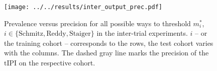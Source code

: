 \begin{figure}
    \centering
    \texttt{[image: ../../results/inter\_output\_prec.pdf]}
    \caption{Prevalence versus precision for all possible ways to threshold $m^*_i$, $i \in 
        \{ \text{Schmitz}, \text{Reddy}, \text{Staiger} \}$ in the inter-trial experiments. $i$ -- or the 
        training cohort -- corresponds to the rows, the test cohort varies with the columns. The 
        dashed gray line marks the precision of the $\text{tIPI}$ on the respective cohort.}
    \label{fig:inter-output-prec}
\end{figure}